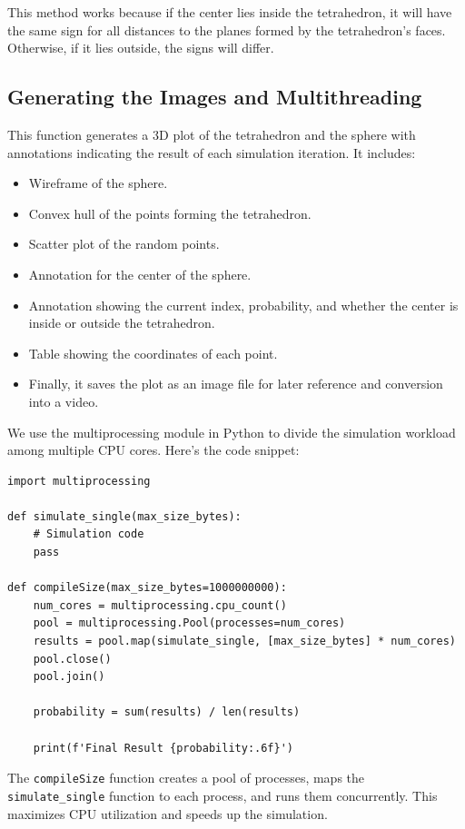 \documentclass{article}
\begin{document}
This method works because if the center lies inside the tetrahedron, it will have the same sign for all distances to the planes formed by the tetrahedron's faces. Otherwise, if it lies outside, the signs will differ.

\subsection{Generating the Images and Multithreading}

This function generates a 3D plot of the tetrahedron and the sphere with annotations indicating the result of each simulation iteration. It includes:
\begin{itemize}
    \item Wireframe of the sphere.
    \item Convex hull of the points forming the tetrahedron.
    \item Scatter plot of the random points.
    \item Annotation for the center of the sphere.
    \item Annotation showing the current index, probability, and whether the center is inside or outside the tetrahedron.
    \item Table showing the coordinates of each point.
    \item Finally, it saves the plot as an image file for later reference and conversion into a video.
\end{itemize}

We use the multiprocessing module in Python to divide the simulation workload among multiple CPU cores. Here's the code snippet:

\begin{verbatim}
import multiprocessing

def simulate_single(max_size_bytes):
    # Simulation code
    pass

def compileSize(max_size_bytes=1000000000):
    num_cores = multiprocessing.cpu_count()
    pool = multiprocessing.Pool(processes=num_cores)
    results = pool.map(simulate_single, [max_size_bytes] * num_cores)
    pool.close()
    pool.join()

    probability = sum(results) / len(results)

    print(f'Final Result {probability:.6f}')
\end{verbatim}

The \texttt{compileSize} function creates a pool of processes, maps the \texttt{simulate\_single} function to each process, and runs them concurrently. This maximizes CPU utilization and speeds up the simulation.
\end{document}

